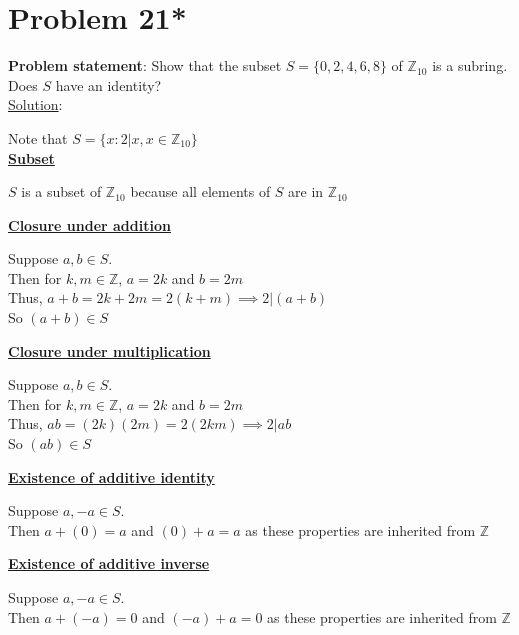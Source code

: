 \documentclass{article} %
\begin{document}
\newpage

\section*{Problem 21*}


\textbf{Problem statement}: Show that the subset $S = \{0,2,4,6,8\}$ of $\mathbb{Z}_{10}$ is a subring. Does $S$ have an identity?
\\

\underline{Solution}:
\begin{addmargin}[1em]{0em}
Note that $S = \{x : 2|x, x \in \mathbb{Z}_{10}\}$ \\
\underline{\textbf{Subset}}
\begin{addmargin}[1em]{0em}
$S$ is a subset of $\mathbb{Z}_{10}$ because all elements of $S$ are in $\mathbb{Z}_{10}$
\end{addmargin} 

\underline{\textbf{Closure under addition}}
\begin{addmargin}[1em]{0em}
Suppose $a, b \in S$.
\\Then for $k,m \in \mathbb{Z}$, $a = 2k$ and $b = 2m$
\\Thus, $a + b = 2k + 2m = 2(k + m) \implies 2|(a+b)$
\\So $(a + b) \in S$
\end{addmargin}

\underline{\textbf{Closure under multiplication}}
\begin{addmargin}[1em]{0em}
Suppose $a, b \in S$.
\\Then for $k,m \in \mathbb{Z}$, $a = 2k$ and $b = 2m$
\\Thus, $ab = (2k)(2m) = 2(2km) \implies 2|ab$
\\So $(ab) \in S$
\end{addmargin}

\underline{\textbf{Existence of additive identity}}
\begin{addmargin}[1em]{0em}
Suppose $a, -a \in S$.
\\Then $a + (0) = a$ and $(0) + a = a$ as these properties are inherited from $\mathbb{Z}$
\end{addmargin}

\underline{\textbf{Existence of additive inverse}}
\begin{addmargin}[1em]{0em}
Suppose $a, -a \in S$.
\\Then $a + (-a) = 0$ and $(-a) + a = 0$ as these properties are inherited from $\mathbb{Z}$
\end{addmargin}


\end{addmargin}
\end{document}
